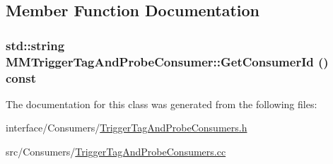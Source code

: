 \subsection{Member Function Documentation}
\hypertarget{classMMTriggerTagAndProbeConsumer_a469599beb930a3d9cdd3252faefa303a}{
\subsubsection[{GetConsumerId}]{\setlength{\rightskip}{0pt plus 5cm}std::string MMTriggerTagAndProbeConsumer::GetConsumerId () const}}
\label{classMMTriggerTagAndProbeConsumer_a469599beb930a3d9cdd3252faefa303a}


The documentation for this class was generated from the following files:\begin{DoxyCompactItemize}
\item 
interface/Consumers/\hyperlink{TriggerTagAndProbeConsumers_8h}{TriggerTagAndProbeConsumers.h}\item 
src/Consumers/\hyperlink{TriggerTagAndProbeConsumers_8cc}{TriggerTagAndProbeConsumers.cc}\end{DoxyCompactItemize}
